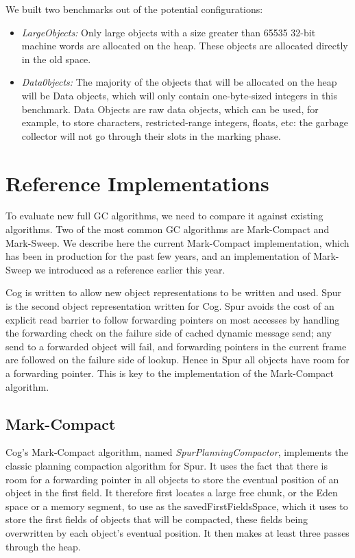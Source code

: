 \documentclass[10pt, sigplan]{acmart}
\begin{document}
We built two benchmarks out of the potential configurations:
\begin{itemize}
\item \emph{LargeObjects:} Only large objects with a size greater than 65535 32-bit machine words are allocated on the heap. These objects are allocated directly in the old space.
\item \emph{Data0bjects:} The majority of the objects that will be allocated on the heap will be Data objects, which will only contain one-byte-sized integers in this benchmark. Data Objects are raw data objects, which can be used, for example, to store characters, restricted-range integers, floats, etc: the garbage collector will not go through their slots in the marking phase.
\end{itemize}

\section{Reference Implementations} \label{sec:ref}

To evaluate new full GC algorithms, we need to compare it against existing algorithms. Two of the most common GC algorithms are Mark-Compact and Mark-Sweep. We describe here the current Mark-Compact implementation, which has been in production for the past few years, and an implementation of Mark-Sweep we introduced as a reference earlier this year.

Cog is written to allow new object representations to be written and used.  Spur \cite{SpurMirandaBera} is the second object representation written for Cog.  Spur avoids the cost of an explicit read barrier to follow forwarding pointers on most accesses by handling the forwarding check on the failure side of cached dynamic message send; any send to a forwarded object will fail, and forwarding pointers in the current frame are followed on the failure side of lookup.  Hence in Spur all objects have room for a forwarding pointer.  This is key to the implementation of the Mark-Compact algorithm. 

\subsection{Mark-Compact} \label{sec:refmc}


Cog's Mark-Compact algorithm, named \emph{SpurPlanningCompactor}, implements the classic planning compaction algorithm for Spur.  It uses the fact that there is room for a forwarding pointer in all objects to store the eventual position of an object in the first field. It therefore first locates a large free chunk, or the Eden space or a memory segment, to use as the savedFirstFieldsSpace, which it uses to store the first fields of objects that will be compacted, these fields being overwritten by each object's eventual position. It then makes at least three passes through the heap.
\end{document}
